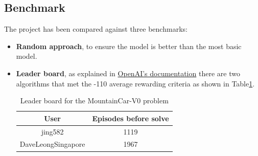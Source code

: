 \subsection{Benchmark}
\label{sub:Benchmark}

The project has been compared against three benchmarks:
\begin{itemize}
\item \textbf{Random approach}, to ensure the model is better than the most basic model.

\item \textbf{Leader board}, as explained in \href{https://github.com/openai/gym/wiki/Leaderboard#mountaincar-v0}{OpenAI's documentation} there are two algorithms that met the -110 average rewarding criteria as shown in Table\ref{tab:crit}. 

\begin{table}[h]
\centering
\begin{tabular}{|c|c|}
\hline
\textbf{User}      & \textbf{Episodes before solve} \\ \hline
jing582            & 1119                           \\ \hline
DaveLeongSingapore & 1967                           \\ \hline
\end{tabular}
\caption{Leader board for the MountainCar-V0 problem}
\label{tab:crit}
\end{table}

\end{itemize}